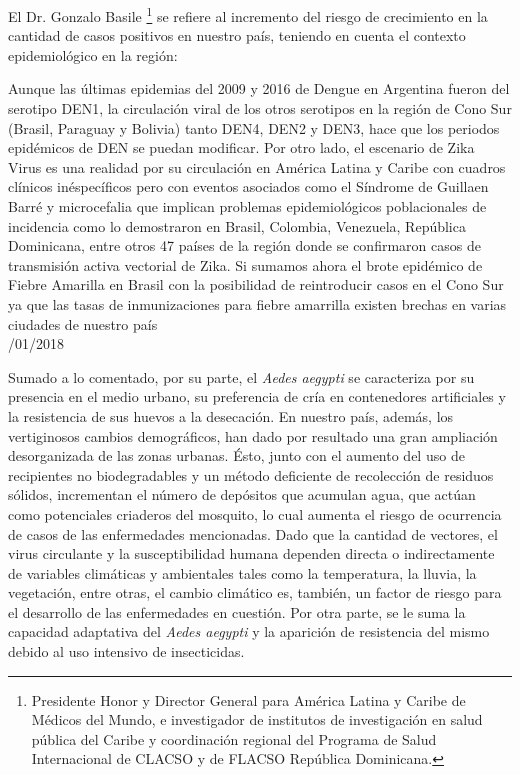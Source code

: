   \par El Dr. Gonzalo Basile \footnote{Presidente Honor y Director General para
                   América Latina y Caribe de Médicos del Mundo, e investigador de institutos de
                   investigación en salud pública del Caribe y coordinación regional del Programa
                   de Salud Internacional de CLACSO y de FLACSO República Dominicana.}
       se refiere al incremento del riesgo de crecimiento
       en la cantidad de casos positivos en nuestro país, teniendo en cuenta
       el contexto epidemiológico en la región:
    \begin{framed}

      Aunque las últimas epidemias del 2009 y 2016 de Dengue en Argentina fueron del
      serotipo DEN1, la circulación viral de los otros serotipos en la región de
      Cono Sur (Brasil, Paraguay y Bolivia) tanto DEN4, DEN2 y DEN3, hace que los
      periodos epidémicos de DEN se puedan modificar. Por otro lado, el escenario de
      Zika Virus es una realidad por su circulación en América Latina y Caribe con
      cuadros clínicos inéspecíficos pero con eventos asociados como el Síndrome de
      Guillaen Barré y microcefalia que implican problemas epidemiológicos
      poblacionales de incidencia como lo demostraron en Brasil, Colombia, Venezuela,
      República Dominicana, entre otros 47 países de la región donde se confirmaron
      casos de transmisión activa vectorial de Zika.
      Si sumamos ahora el brote epidémico de Fiebre Amarilla en Brasil con la
      posibilidad de reintroducir casos en el Cono Sur ya que las tasas de
      inmunizaciones para fiebre amarrilla existen brechas en varias ciudades de nuestro país \\

     /01/2018
    \end{framed}



  \par Sumado a lo comentado, por su parte, el \textit{Aedes aegypti} se
    caracteriza por su presencia en el medio urbano, su preferencia
    de cría en contenedores artificiales \cite{cont_artificiales} y la
    resistencia de sus huevos a la
    desecación. En nuestro país, además, los vertiginosos cambios demográficos, han dado
    por resultado una gran ampliación desorganizada de las zonas urbanas. Ésto, junto
    con el aumento del uso de recipientes no biodegradables y un método deficiente
    de recolección de residuos sólidos, incrementan el número de depósitos que
    acumulan agua, que actúan como potenciales criaderos del mosquito, lo cual aumenta el
    riesgo de ocurrencia de casos de las enfermedades mencionadas.
    Dado que la cantidad de vectores, el virus circulante y la susceptibilidad
    humana dependen directa o indirectamente de variables climáticas y ambientales
    tales como la temperatura, la lluvia, la vegetación, entre otras,
    el cambio climático es, también, un factor de riesgo para el desarrollo
    de las enfermedades en cuestión. Por otra parte, se le suma la capacidad adaptativa del
    \textit{Aedes aegypti} y la aparición de resistencia del mismo debido al uso intensivo de
    insecticidas.


